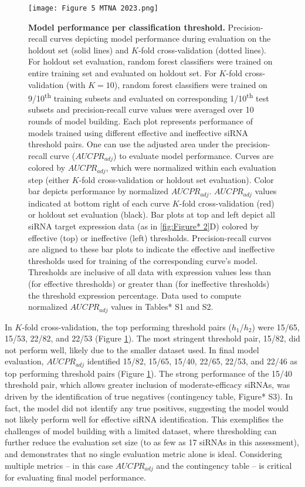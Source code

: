 \documentclass{report}
\begin{document}
 
\begin{figure}
    \centering
    \texttt{[image: Figure 5 MTNA 2023.png]}
    \caption{\textbf{Model performance per classification threshold. }Precision-recall curves depicting model performance during evaluation on the holdout set (solid lines) and $K$-fold cross-validation (dotted lines). For holdout set evaluation, random forest classifiers were trained on entire training set and evaluated on holdout set. For $K$-fold cross-validation (with $K=10$), random forest classifiers were trained on 9/10\textsuperscript{th} training subsets and evaluated on corresponding 1/10\textsuperscript{th} test subsets and precision-recall curve values were averaged over 10 rounds of model building. Each plot represents performance of models trained using different effective and ineffective siRNA threshold pairs. One can use the adjusted area under the precision-recall curve ($AUCPR_{adj}$) to evaluate model performance. Curves are colored by $AUCPR_{adj}$, which were normalized within each evaluation step (either $K$-fold cross-validation or holdout set evaluation). Color bar depicts performance by normalized $AUCPR_{adj}$. $AUCPR_{adj}$ values indicated at bottom right of each curve $K$-fold cross-validation (red) or holdout set evaluation (black). Bar plots at top and left depict all siRNA target expression data (as in \ref{fig:Figure* 2}D) colored by effective (top) or ineffective (left) thresholds. Precision-recall curves are aligned to these bar plots to indicate the effective and ineffective thresholds used for training of the corresponding curve’s model. Thresholds are inclusive of all data with expression values less than (for effective thresholds) or greater than (for ineffective thresholds) the threshold expression percentage. Data used to compute normalized $AUCPR_{adj}$ values in Tables* S1 and S2.
}
    \label{fig:Figure* 5}
\end{figure}

 In $K$-fold cross-validation, the top performing threshold pairs ($h_1$/$h_2$) were 15/65, 15/53, 22/82, and 22/53 (Figure \ref{fig:Figure* 5}). The most stringent threshold pair, 15/82, did not perform well, likely due to the smaller dataset used. In final model evaluation, $AUCPR_{adj}$  identified 15/82, 15/65, 15/40, 22/65, 22/53, and 22/46 as top performing threshold pairs (Figure \ref{fig:Figure* 5}). The strong performance of the 15/40 threshold pair, which allows greater inclusion of moderate-efficacy siRNAs, was driven by the identification of true negatives (contingency table, Figure* S3). In fact, the model did not identify any true positives, suggesting the model would not likely perform well for effective siRNA identification. This exemplifies the challenges of model building with a limited dataset, where thresholding can further reduce the evaluation set size (to as few as 17 siRNAs in this assessment), and demonstrates that no single evaluation metric alone is ideal. Considering multiple metrics – in this case $AUCPR_{adj}$ and the contingency table – is critical for evaluating final model performance. 
\end{document}
